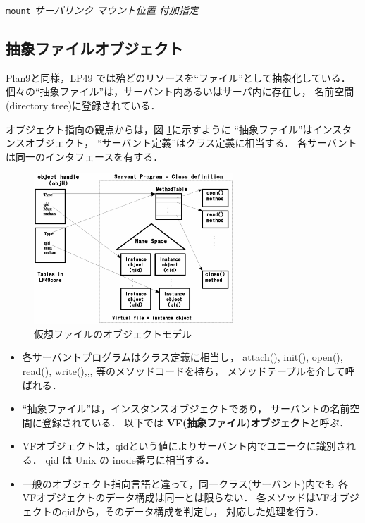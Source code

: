 \documentclass{ieicej}
\begin{document}
  {\tt mount}  {\em\small サーバリンク}  {\em\small マウント位置}  {\em\small 付加指定} 


\subsection{抽象ファイルオブジェクト}\label{sec:VF}

Plan9と同様，LP49 では殆どのリソースを``ファイル''として抽象化している．
個々の``抽象ファイル''は，サーバント内あるいはサーバ内に存在し，
名前空間(directory tree)に登録されている．

オブジェクト指向の観点からは，図 \ref{fig:VirtualFileObject}に示すように
``抽象ファイル''はインスタンスオブジェクト，
``サーバント定義''はクラス定義に相当する．
各サーバントは同一のインタフェースを有する．

\begin{figure}[tb]
  \begin{center}
   \includegraphics[width=75mm]{../fig/VirtualFileObject.eps}
    \caption{仮想ファイルのオブジェクトモデル}
    \label{fig:VirtualFileObject}
  \end{center}
\end{figure}


\begin{itemize}
\item  各サーバントプログラムはクラス定義に相当し，
  attach(), init(), open(), read(), write(),,, 等のメソッドコードを持ち，
  メソッドテーブルを介して呼ばれる．
\item  ``抽象ファイル''は，インスタンスオブジェクトであり，
   サーバントの名前空間に登録されている．
   以下では {\bf VF(抽象ファイル)オブジェクト}と呼ぶ．

\item  VFオブジェクトは，qidという値によりサーバント内でユニークに識別される．
       qid は Unix の inode番号に相当する．

\item  一般のオブジェクト指向言語と違って，同一クラス(サーバント)内でも
       各VFオブジェクトのデータ構成は同一とは限らない．
       各メソッドはVFオブジェクトのqidから，そのデータ構成を判定し，
       対応した処理を行う．

\end{itemize}
\end{document}
